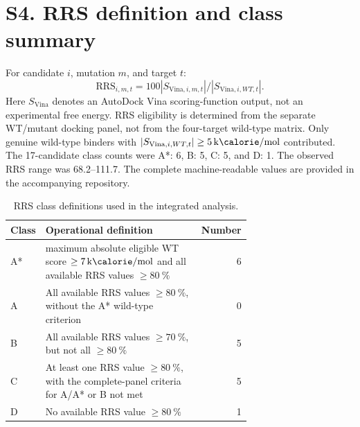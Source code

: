 \documentclass[journal=jcisd8,manuscript=suppinfo]{achemso}
\begin{document}
\section*{S4. RRS definition and class summary}
For candidate $i$, mutation $m$, and target $t$:
\[
\mathrm{RRS}_{i,m,t}=100|S_{\mathrm{Vina},i,m,t}|/|S_{\mathrm{Vina},i,WT,t}|.
\]
Here $S_{\mathrm{Vina}}$ denotes an AutoDock Vina scoring-function output, not an experimental free energy. RRS eligibility is determined from the separate WT/mutant docking panel, not from the four-target wild-type matrix. Only genuine wild-type binders with $|S_{\mathrm{Vina},i,WT,t}|\geq\qty{5}{\kilo\calorie\per\mole}$ contributed. The 17-candidate class counts were A*: \num{6}, B: \num{5}, C: \num{5}, and D: \num{1}. The observed RRS range was \numrange{68.2}{111.7}. The complete machine-readable values are provided in the accompanying repository.

\begin{table}[h]
\centering
\caption{RRS class definitions used in the integrated analysis.}
\label{tab:rrs_classes}
\begin{tabular}{@{}l>{\raggedright\arraybackslash}p{0.69\linewidth}r@{}}
\toprule
Class & Operational definition & Number \\
\midrule
A* & maximum absolute eligible WT score $\geq\qty{7}{\kilo\calorie\per\mole}$ and all available RRS values $\geq\qty{80}{\percent}$ & 6 \\
A & All available RRS values $\geq\qty{80}{\percent}$, without the A* wild-type criterion & 0 \\
B & All available RRS values $\geq\qty{70}{\percent}$, but not all $\geq\qty{80}{\percent}$ & 5 \\
C & At least one RRS value $\geq\qty{80}{\percent}$, with the complete-panel criteria for A/A* or B not met & 5 \\
D & No available RRS value $\geq\qty{80}{\percent}$ & 1 \\
\bottomrule
\end{tabular}
\end{table}
\end{document}
